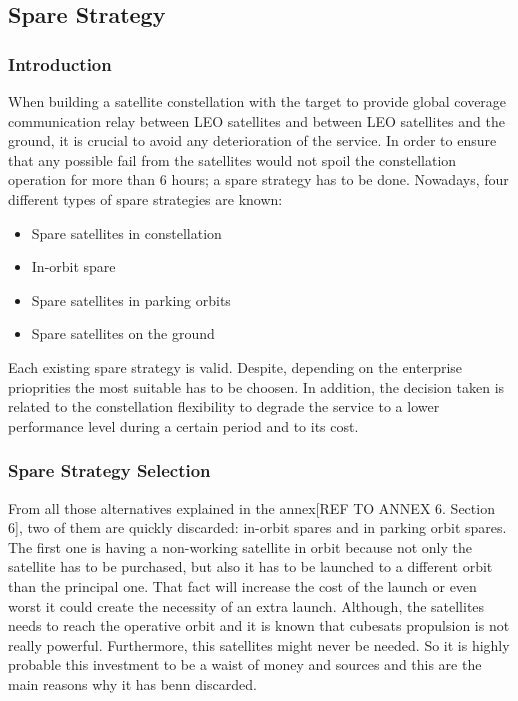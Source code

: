 \subsection{Spare Strategy}

\subsubsection{Introduction}
When building a satellite constellation with the target to provide global coverage communication relay between LEO satellites and between LEO satellites and the ground, it is crucial to avoid any deterioration of the service. In order to ensure that any possible fail from the satellites would not spoil the constellation operation for more than 6 hours; a spare strategy has to be done. Nowadays, four different types of spare strategies are known:

\begin{itemize} 
\item {Spare satellites in constellation}
\item {In-orbit spare} 
\item {Spare satellites in parking orbits} 
\item {Spare satellites on the ground} 
\end{itemize}

Each existing spare strategy is valid. Despite, depending on the enterprise prioprities the most suitable has to be choosen. In addition, the decision taken is related to the constellation flexibility to degrade the service to a lower performance level during a certain period and to its cost. 

\subsubsection{Spare Strategy Selection}
From all those alternatives explained in the annex[{REF TO ANNEX 6. Section 6}], two of them  are quickly discarded: in-orbit spares and in parking orbit spares. The first one is having a non-working satellite in orbit because not only the satellite has to be purchased, but also it has to be launched to a different orbit than the principal one. That fact will increase the cost of the launch or even worst it could create the necessity of an extra launch. Although, the satellites needs to reach the operative orbit and it is known that cubesats propulsion is not really powerful. Furthermore, this satellites might never be needed. So it is highly probable this investment to be a waist of money and sources and this are the main reasons why it has benn discarded.

